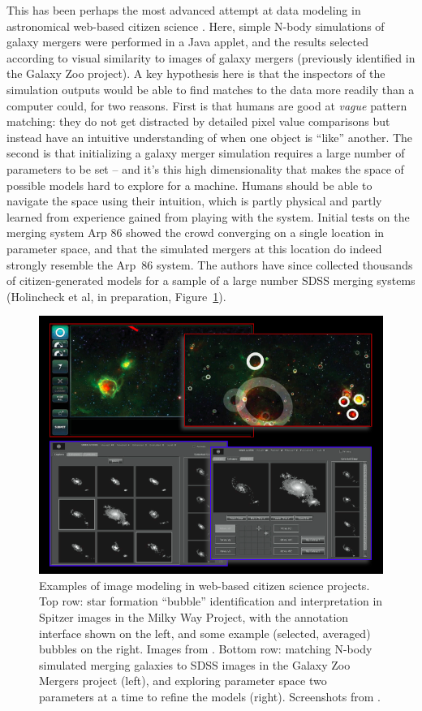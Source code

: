 \documentclass{ar2e}
\def\Fref#1{Figure~\ref{#1}\xspace}
\def\CaseStudy#1{\noindent{\it\bf #1 \,\,\,\,}}
\begin{document}
\CaseStudy{Galaxy Zoo: Mergers} 
This has been perhaps the most advanced attempt at data modeling in 
astronomical web-based citizen science \citep{HolincheckEtal2010,WallinEtal2010}.
Here, simple N-body simulations of galaxy mergers were performed in a Java
applet, and the results selected according to visual similarity to images of
galaxy mergers (previously identified in the Galaxy Zoo project). A key
hypothesis here is that the inspectors of the simulation outputs would be able
to find matches to the data more readily than a computer could, for two reasons.
First is that humans are good at {\it vague} pattern matching: they do not get
distracted by detailed pixel value comparisons but instead have an intuitive
understanding of when one object is ``like'' another. The second is that
initializing a galaxy merger simulation requires a large number of parameters to
be set -- and it's this high dimensionality  that makes the space of possible
models hard to explore for a machine. Humans should be able to navigate the
space using their intuition, which is partly physical and partly learned from
experience gained from playing with the system. Initial tests on the merging
system Arp 86 showed
the crowd converging on a single location in parameter space, and that the
simulated mergers at this location do indeed strongly resemble the Arp~86
system. The authors have since collected thousands of citizen-generated models
for a sample of a large number SDSS merging systems (Holincheck et al, in
preparation, \Fref{fig:modeling}). 

\begin{figure}[!ht]
\centering\includegraphics[width=\linewidth]{figs/modeling.png}
\caption{Examples of image modeling in web-based citizen science projects. Top
row: star formation ``bubble'' identification and interpretation in Spitzer
images in the Milky Way Project, with the annotation interface shown on the
left, and some example (selected, averaged) bubbles on the right. Images from
\citet{Simpson++2012MWP}. Bottom row: matching N-body simulated merging
galaxies to SDSS images in the Galaxy Zoo Mergers project (left), and
exploring parameter space two parameters at a time to refine the models
(right). Screenshots from \citet{HolincheckEtal2010}.}
\label{fig:modeling}
\end{figure}
\end{document}
